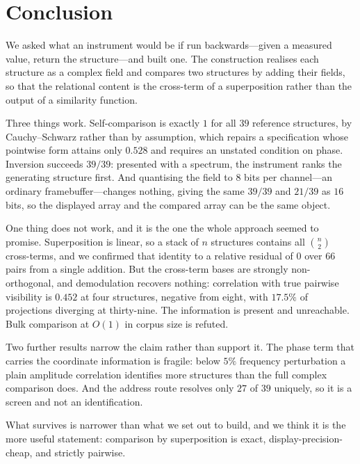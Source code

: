 \documentclass[11pt,twocolumn,a4paper]{article}
\theoremstyle{upthm}
\theoremstyle{definition}
\theoremstyle{remark}
\begin{document}
\section{Conclusion}
\label{sec:conclusion}

We asked what an instrument would be if run backwards---given a measured
value, return the structure---and built one. The construction realises
each structure as a complex field and compares two structures by adding
their fields, so that the relational content is the cross-term of a
superposition rather than the output of a similarity function.

Three things work. Self-comparison is exactly $1$ for all $39$ reference
structures, by Cauchy--Schwarz rather than by assumption, which repairs a
specification whose pointwise form attains only $0.528$ and requires an
unstated condition on phase. Inversion succeeds $39/39$: presented with a
spectrum, the instrument ranks the generating structure first. And
quantising the field to $8$ bits per channel---an ordinary
framebuffer---changes nothing, giving the same $39/39$ and $21/39$ as
$16$ bits, so the displayed array and the compared array can be the same
object.

One thing does not work, and it is the one the whole approach seemed to
promise. Superposition is linear, so a stack of $n$ structures contains
all $\binom{n}{2}$ cross-terms, and we confirmed that identity to a
relative residual of $0$ over $66$ pairs from a single addition. But the
cross-term bases are strongly non-orthogonal, and demodulation recovers
nothing: correlation with true pairwise visibility is $0.452$ at four
structures, negative from eight, with $17.5\%$ of projections diverging
at thirty-nine. The information is present and unreachable. Bulk
comparison at $O(1)$ in corpus size is refuted.

Two further results narrow the claim rather than support it. The phase
term that carries the coordinate information is fragile: below $5\%$
frequency perturbation a plain amplitude correlation identifies more
structures than the full complex comparison does. And the address route
resolves only $27$ of $39$ uniquely, so it is a screen and not an
identification.

What survives is narrower than what we set out to build, and we think it
is the more useful statement: comparison by superposition is exact,
display-precision-cheap, and strictly pairwise.
\end{document}
